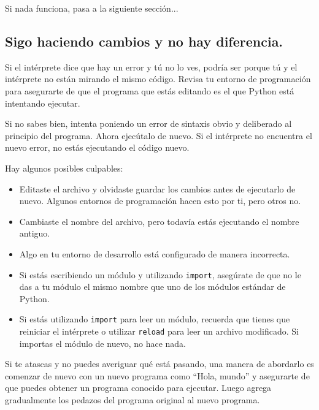 \documentclass[10pt]{book}
\begin{document}
Si nada funciona, pasa a la siguiente sección...


\subsection{Sigo haciendo cambios y no hay diferencia.}

Si el intérprete dice que hay un error y tú no lo ves,
podría ser porque tú y el intérprete no están mirando el mismo
código.  Revisa tu entorno de programación para asegurarte de que el
programa que estás editando es el que Python está intentando ejecutar.

Si no sabes bien, intenta poniendo un error de sintaxis obvio y deliberado
al principio del programa.  Ahora ejecútalo de nuevo.  Si el
intérprete no encuentra el nuevo error, no estás ejecutando el
código nuevo.

Hay algunos posibles culpables:

\begin{itemize}

\item Editaste el archivo y olvidaste guardar los cambios antes de
ejecutarlo de nuevo.  Algunos entornos de programación hacen esto
por ti, pero otros no.

\item Cambiaste el nombre del archivo, pero todavía estás ejecutando
el nombre antiguo.

\item Algo en tu entorno de desarrollo está configurado
de manera incorrecta.

\item Si estás escribiendo un módulo y utilizando {\tt import},
asegúrate de que no le das a tu módulo el mismo nombre que uno
de los módulos estándar de Python.

\item Si estás utilizando {\tt import} para leer un módulo, recuerda
que tienes que reiniciar el intérprete o utilizar {\tt reload}
para leer un archivo modificado.  Si importas el módulo de nuevo,
no hace nada.

\end{itemize}

Si te atascas y no puedes averiguar qué está pasando, una
manera de abordarlo es comenzar de nuevo con un nuevo programa como ``Hola, mundo''
y asegurarte de que puedes obtener un programa conocido para ejecutar.  Luego agrega gradualmente
los pedazos del programa original al nuevo programa.
\end{document}
